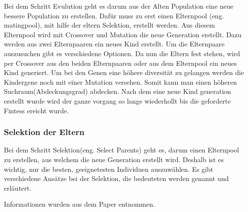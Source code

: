 Bei dem Schritt Evulution geht es darum aus der Alten Population eine neue bessere Population zu erstellen. Dafür muss zu erst einen Elternpool (eng. matingpool), mit hilfe der eltern Selektion, erstellt werden. Aus diesem Elternpool wird mit Crossover und Mutation die neue Generation erstellt. 
Dazu  werden aus zwei Elternpaaren ein neues Kind erstellt.
Um die Elternpaare auszusuchen gibt es verschiedene Optionen. Da nun die Eltern fest stehen, wird per Crossover aus den beiden Elternpaaren oder aus dem Elternpool ein neues Kind generiert. Um bei den Genen eine höhere diversität zu gelangen werden die Kindergene noch mit einer Mutation versehen. Somit kann man einen höheren Suchraum(Abdeckungsgrad) abdecken. Nach dem eine neue Kind generation erstellt wurde wird der ganze vorgang so lange wiederhollt bis die geforderte Fintess ereicht wurde.

\fi

\subsubsection{Selektion der Eltern}
Bei dem Schritt Selektion(eng. Select Parents) geht es, darum einen Elternpool zu erstellen, aus welchem die neue Generation erstellt wird. Deshalb ist es wichtig, nur die besten, geeignetesten Individuen auszuwählen. Es gibt verschiedene Ansätze bei der Selektion, die bedeuteten werden genannt und erläutert.

Informationen wurden aus dem Paper \cite{shukla15} entnommen.


